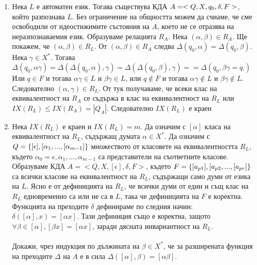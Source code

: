 \documentclass[11pt]{article} %
\begin{document}
\proof
\renewcommand{\theenumi}{\arabic{enumi}}
\begin{enumerate}
	\item Нека $L$ е автоматен език. Тогава съществува КДА $A = <Q, X, q_{0}, \delta, F>$, който разпознава $L$. Без ограничение на общността можем да счиаме, че сме освободили от ндеостижимите състояния на $A$, което не се отразява на неразпознаваемия език. Образуваме релацията $R_{A}$. Нека $(\alpha, \beta) \in R_{A}$. Ще покажем, че $(\alpha, \beta) \in R_{L}$. От $(\alpha, \beta) \in R_{A}$ следва $\Delta(q_{0}, \alpha) = \Delta(q_{0}, \beta).$ Нека $\gamma \in X^{*}$. Тогава $\Delta(q_{0}, \alpha \gamma) = \Delta(\Delta(q_{0}, \alpha), \gamma)
	= \Delta(\Delta(q_{0}, \beta), \gamma) = = \Delta(q_{0}, \beta \gamma = q.)$
	Или $q \in F$ и тогава $\alpha \gamma \in L$ и $\beta \gamma \in L$, или $q \notin F$ и тогава $\alpha \gamma \notin L$ и $\beta \gamma \notin L$.
	Следователно $(\alpha, \gamma) \in R_{L}$. От тук получаваме, че всеки клас на еквивалентност на $R_{A}$ се съдържа в клас на еквивалентност на $R_{L}$ или $IX(R_{L}) \leq IX(R_{A}) = |Q_{A}|$. Следователно $IX(R_{L})$ е краен
	\item Нека $IX(R_{L})$ е краен и $IX(R_{L}) = m$. Да означим с $[\alpha]$ класа на еквивалентност на $R_{L}$, съдържащ думата $\alpha \in X^{*}$. 
	Да означим с $Q = \{[\epsilon], [\alpha_{1}, ... , [\alpha_{m-1}]\}$ множеството от класовете на еквивалентността $R_{L}$, където $\alpha_{0} = \epsilon, \alpha_{1}, ..., \alpha_{m-1}$ са представители на съответните класове.
	 Образуваме КДА $A = < Q, X, [\epsilon], \delta, F >$, където $F = \{[a_{p1}], [a_{p2},...,[a_{pr}]\}$ са всички класове на еквивалентност на $R_{L}$, съдържащи само думи от езика на $L$. Ясно е от дефиницията на $R_{L}$, че всички думи от един и същ клас на $R_{L}$ едновременно са или не са в $L$, така че дефиницията на $F$ е коректна. 
	 Функцията на преходите $\delta$ дефинираме по следния начин: $\delta([\alpha], x) = [\alpha x]$. Тази дефиниция също е коректна, защото $\forall \beta \in [\alpha], [\beta x] = [\alpha x]$, заради дясната инвариантност на $R_{L}$.
	 \\ \\
	 {Докажи, чрез индукция по дължината на $\beta \in X^{*}$, че за разширената функция на преходите $\Delta$ на $A$ е в сила $\Delta([\alpha], \beta) = [\alpha \beta]$}.
	 \\ \\ 

\end{enumerate}
 
\end{document}

